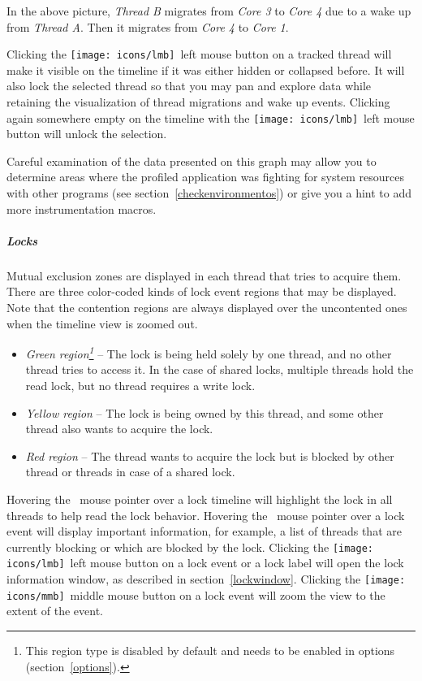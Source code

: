 \documentclass[hidelinks,titlepage,a4paper,twoside]{article}
\newcommand{\LMB}{\texttt{[image: icons/lmb]}}
\newcommand{\MMB}{\texttt{[image: icons/mmb]}}
\begin{document}
In the above picture, \emph{Thread B} migrates from \emph{Core 3} to \emph{Core 4} due to a wake up from \emph{Thread A}. Then it migrates from \emph{Core 4} to \emph{Core 1}.

Clicking the \LMB{}~left mouse button on a tracked thread will make it visible on the timeline if it was either hidden or collapsed before. It will also lock the selected thread so that you may pan and explore data while retaining the visualization of thread migrations and wake up events. 
Clicking again somewhere empty on the timeline with the \LMB{}~left mouse button will unlock the selection.

Careful examination of the data presented on this graph may allow you to determine areas where the profiled application was fighting for system resources with other programs (see section~\ref{checkenvironmentos}) or give you a hint to add more instrumentation macros.

\subparagraph{Locks}

Mutual exclusion zones are displayed in each thread that tries to acquire them. There are three color-coded kinds of lock event regions that may be displayed. Note that the contention regions are always displayed over the uncontented ones when the timeline view is zoomed out.

\begin{itemize}
\item \emph{Green region\footnote{This region type is disabled by default and needs to be enabled in options (section~\ref{options}).}} -- The lock is being held solely by one thread, and no other thread tries to access it. In the case of shared locks, multiple threads hold the read lock, but no thread requires a write lock.
\item \emph{Yellow region} -- The lock is being owned by this thread, and some other thread also wants to acquire the lock.
\item \emph{Red region} -- The thread wants to acquire the lock but is blocked by other thread or threads in case of a shared lock.
\end{itemize}

Hovering the \faMousePointer{}~mouse pointer over a lock timeline will highlight the lock in all threads to help read the lock behavior. Hovering the \faMousePointer{}~mouse pointer over a lock event will display important information, for example, a list of threads that are currently blocking or which are blocked by the lock. Clicking the \LMB{}~left mouse button on a lock event or a lock label will open the lock information window, as described in section~\ref{lockwindow}. Clicking the \MMB{}~middle mouse button on a lock event will zoom the view to the extent of the event.
\end{document}

